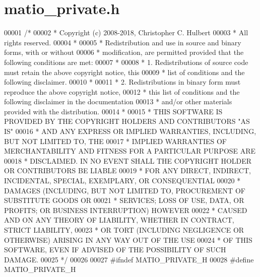\hypertarget{matio__private_8h_source}{}\section{matio\+\_\+private.\+h}
\label{matio__private_8h_source}

\begin{DoxyCode}
00001 \textcolor{comment}{/*}
00002 \textcolor{comment}{ * Copyright (c) 2008-2018, Christopher C. Hulbert}
00003 \textcolor{comment}{ * All rights reserved.}
00004 \textcolor{comment}{ *}
00005 \textcolor{comment}{ * Redistribution and use in source and binary forms, with or without}
00006 \textcolor{comment}{ * modification, are permitted provided that the following conditions are met:}
00007 \textcolor{comment}{ *}
00008 \textcolor{comment}{ * 1. Redistributions of source code must retain the above copyright notice, this}
00009 \textcolor{comment}{ *    list of conditions and the following disclaimer.}
00010 \textcolor{comment}{ *}
00011 \textcolor{comment}{ * 2. Redistributions in binary form must reproduce the above copyright notice,}
00012 \textcolor{comment}{ *    this list of conditions and the following disclaimer in the documentation}
00013 \textcolor{comment}{ *    and/or other materials provided with the distribution.}
00014 \textcolor{comment}{ *}
00015 \textcolor{comment}{ * THIS SOFTWARE IS PROVIDED BY THE COPYRIGHT HOLDERS AND CONTRIBUTORS "AS IS"}
00016 \textcolor{comment}{ * AND ANY EXPRESS OR IMPLIED WARRANTIES, INCLUDING, BUT NOT LIMITED TO, THE}
00017 \textcolor{comment}{ * IMPLIED WARRANTIES OF MERCHANTABILITY AND FITNESS FOR A PARTICULAR PURPOSE ARE}
00018 \textcolor{comment}{ * DISCLAIMED. IN NO EVENT SHALL THE COPYRIGHT HOLDER OR CONTRIBUTORS BE LIABLE}
00019 \textcolor{comment}{ * FOR ANY DIRECT, INDIRECT, INCIDENTAL, SPECIAL, EXEMPLARY, OR CONSEQUENTIAL}
00020 \textcolor{comment}{ * DAMAGES (INCLUDING, BUT NOT LIMITED TO, PROCUREMENT OF SUBSTITUTE GOODS OR}
00021 \textcolor{comment}{ * SERVICES; LOSS OF USE, DATA, OR PROFITS; OR BUSINESS INTERRUPTION) HOWEVER}
00022 \textcolor{comment}{ * CAUSED AND ON ANY THEORY OF LIABILITY, WHETHER IN CONTRACT, STRICT LIABILITY,}
00023 \textcolor{comment}{ * OR TORT (INCLUDING NEGLIGENCE OR OTHERWISE) ARISING IN ANY WAY OUT OF THE USE}
00024 \textcolor{comment}{ * OF THIS SOFTWARE, EVEN IF ADVISED OF THE POSSIBILITY OF SUCH DAMAGE.}
00025 \textcolor{comment}{ */}
00026 
00027 \textcolor{preprocessor}{#ifndef MATIO\_PRIVATE\_H}
00028 \textcolor{preprocessor}{#define MATIO\_PRIVATE\_H}

\end{DoxyCode}
